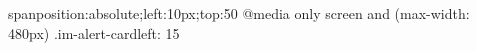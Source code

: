 {{{{{span{position:absolute;left:10px;top:50%
}
@media only screen and (max-width: 480px){ .im-alert-card{left: 15%
}}}}}}}

